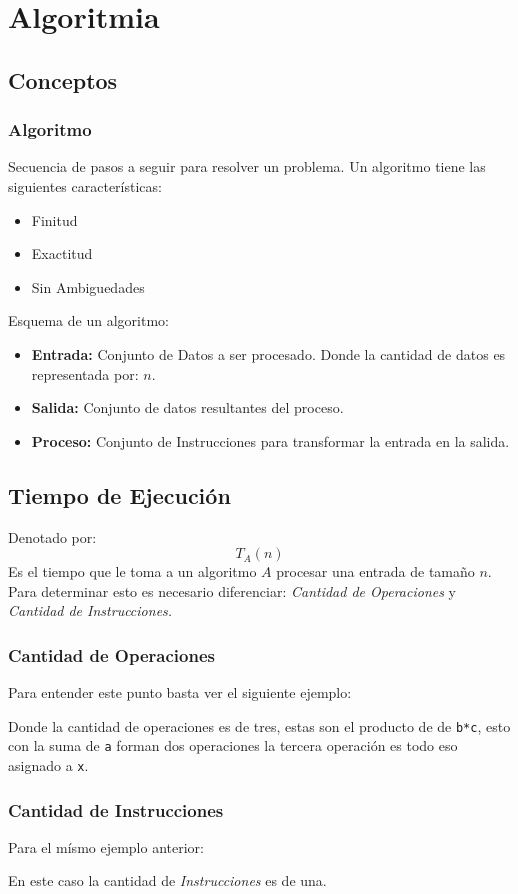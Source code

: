 \section{Algoritmia}
\subsection{Conceptos}
\subsubsection{Algoritmo}
Secuencia de pasos a seguir para resolver un problema. Un algoritmo tiene las siguientes características:
\begin{itemize}
\item Finitud
\item Exactitud
\item Sin Ambiguedades
\end{itemize}
Esquema de un algoritmo:
\begin{itemize}
\item \textbf{Entrada:} Conjunto de Datos a ser procesado. Donde la cantidad de datos es representada por: $n$.
\item \textbf{Salida:} Conjunto de datos resultantes del proceso.
\item \textbf{Proceso:} Conjunto de Instrucciones para transformar la entrada en la salida.
\end{itemize}
\subsection{Tiempo de Ejecución}
Denotado por:
$$T_A(n)$$
Es el tiempo que le toma a un algoritmo $A$ procesar una entrada de tamaño $n$. Para determinar esto es necesario diferenciar: \textit{Cantidad de Operaciones} y \textit{Cantidad de Instrucciones.}
\subsubsection{Cantidad de Operaciones}
Para entender este punto basta ver el siguiente ejemplo:

Donde la cantidad de operaciones es de tres, estas son el producto de de \texttt{b*c}, esto con la suma de \texttt{a} forman dos operaciones la tercera operación es todo eso asignado a \texttt{x}.
\subsubsection{Cantidad de Instrucciones}
Para el mísmo ejemplo anterior:

En este caso la cantidad de \textit{Instrucciones} es de una.
